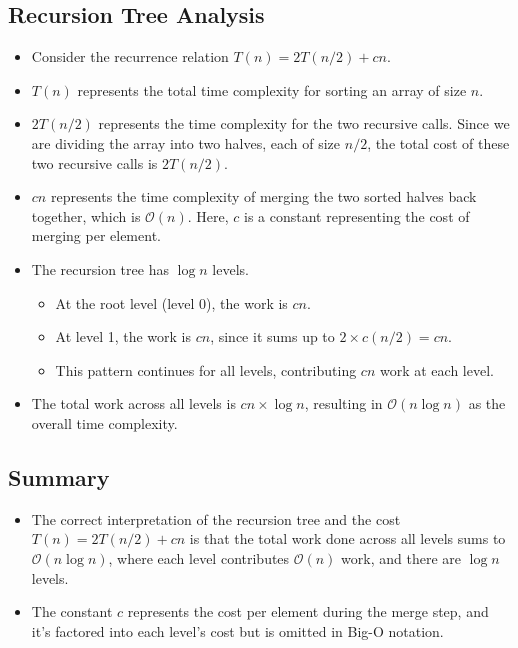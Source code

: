 \documentclass{article}
\begin{document}
\subsection*{Recursion Tree Analysis}

\begin{itemize}
    \item Consider the recurrence relation \( T(n) = 2T(n/2) + cn \).
    \item \( T(n) \) represents the total time complexity for sorting an array of size \( n \).
    \item \( 2T(n/2) \) represents the time complexity for the two recursive calls. Since we are dividing the array into two halves, each of size \( n/2 \), the total cost of these two recursive calls is \( 2T(n/2) \).
    \item \( cn \) represents the time complexity of merging the two sorted halves back together, which is \( \mathcal{O}(n) \). Here, \( c \) is a constant representing the cost of merging per element.
    \item The recursion tree has \( \log n \) levels.
        \begin{itemize}
            \item At the root level (level 0), the work is \( cn \).
            \item At level 1, the work is \( cn \), since it sums up to \( 2 \times c(n/2) = cn \).
            \item This pattern continues for all levels, contributing \( cn \) work at each level.
        \end{itemize}
    \item The total work across all levels is \( cn \times \log n \), resulting in \( \mathcal{O}(n \log n) \) as the overall time complexity.
\end{itemize}

\subsection*{Summary}
\begin{itemize}
    \item The correct interpretation of the recursion tree and the cost \( T(n) = 2T(n/2) + cn \) is that the total work done across all levels sums to \( \mathcal{O}(n \log n) \), where each level contributes \( \mathcal{O}(n) \) work, and there are \( \log n \) levels.
    \item The constant \( c \) represents the cost per element during the merge step, and it's factored into each level's cost but is omitted in Big-O notation.
\end{itemize}
\end{document}
